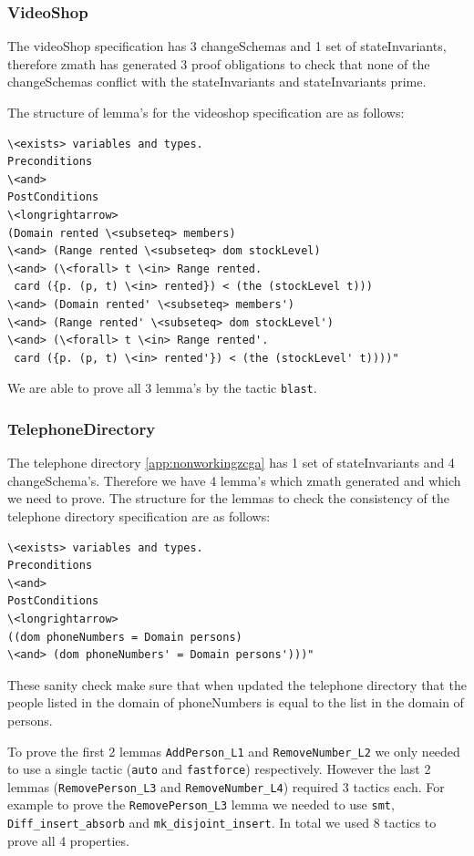 \subsubsection{VideoShop}

The videoShop specification \cite{mathlangexamples} has 3 changeSchemas and 1 set of stateInvariants,
therefore \gls{zmath} has generated 3 proof obligations to check that none of
the changeSchemas conflict with the stateInvariants and stateInvariants prime.

The structure of lemma's for the videoshop specification are as follows:

\begin{verbatim}
\<exists> variables and types.
Preconditions
\<and>
PostConditions
\<longrightarrow>
(Domain rented \<subseteq> members)
\<and> (Range rented \<subseteq> dom stockLevel)
\<and> (\<forall> t \<in> Range rented.
 card ({p. (p, t) \<in> rented}) < (the (stockLevel t)))
\<and> (Domain rented' \<subseteq> members')
\<and> (Range rented' \<subseteq> dom stockLevel')
\<and> (\<forall> t \<in> Range rented'.
 card ({p. (p, t) \<in> rented'}) < (the (stockLevel' t))))"
\end{verbatim}

We are able to prove all 3 lemma's by the tactic \verb|blast|. 

\subsubsection{TelephoneDirectory}

The telephone directory \ref{app:nonworkingzcga} has 1 set of stateInvariants and 4 changeSchema's.
Therefore we have 4 lemma's which \gls{zmath} generated and which we need to
prove. The structure for the lemmas to check the consistency of the telephone
directory specification are as follows:

\begin{verbatim}
\<exists> variables and types.
Preconditions
\<and>
PostConditions
\<longrightarrow>
((dom phoneNumbers = Domain persons)
\<and> (dom phoneNumbers' = Domain persons')))"
\end{verbatim}

These sanity check make sure that when updated the telephone directory that the
people listed in the domain of phoneNumbers is equal to the list in the domain
of persons.

To prove the first 2 lemmas \verb|AddPerson_L1| and \verb|RemoveNumber_L2| we
only needed to use a single tactic (\verb|auto| and \verb|fastforce|)
respectively. However the last 2 lemmas (\verb|RemovePerson_L3| and
\verb|RemoveNumber_L4|) required 3 tactics each. For example to prove the
\verb|RemovePerson_L3| lemma we needed to use \verb|smt|,
\verb|Diff_insert_absorb| and \verb|mk_disjoint_insert|. In total we used 8
tactics to prove all 4 properties.

